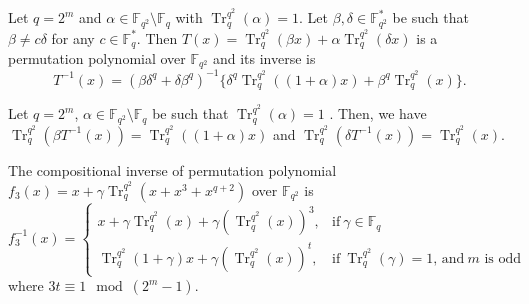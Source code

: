 \documentclass[10pt,a4paper]{amsart}
\begin{document}
	\begin{lem}\label{lem2}
		Let $q=2^m$ and $\alpha\in\mathbb{F}_{q^2}\setminus\mathbb{F}_q$ with $\operatorname{Tr}_q^{q^2}(\alpha)=1$.  Let $\beta, \delta \in \mathbb{F}^{*}_{q^2}$ be such that $\beta \neq c\delta$ for any $c \in \mathbb{F}^{*}_{q}$. 
		Then 
		$T(x)=\operatorname{Tr}_{q}^{q^2}(\beta x)+\alpha\operatorname{Tr}_{q}^{q^2}(\delta x)$ is a permutation polynomial over $\mathbb{F}_{q^2}$ and its inverse is
		$$T^{-1}(x)=(\beta\delta^{q}+\delta\beta^{q})^{-1}\{\delta^{q}\operatorname{Tr}_{q}^{q^2}((1+\alpha)x)+\beta^{q}\operatorname{Tr}_{q}^{q^2}(x)\}.$$
	\end{lem}

	\begin{lem} \label{lem3}
		Let $q=2^m$, $\alpha\in\mathbb{F}_{q^2}\setminus\mathbb{F}_q$ be such that $\operatorname{Tr}_q^{q^2}(\alpha)=1$ . Then, we have 
		$\operatorname{Tr}_{q}^{q^2}(\beta T^{-1}(x))=\operatorname{Tr}_{q}^{q^2}((1+\alpha)x)$ and 
		$\operatorname{Tr}_{q}^{q^2}(\delta T^{-1}(x))=\operatorname{Tr}_{q}^{q^2}(x).$
	\end{lem}

\begin{thm} The compositional inverse of permutation polynomial 
		$f_3(x)=x+\gamma\operatorname{Tr}_{q}^{q^2}(x+x^3+x^{q+2})$ over $\mathbb{F}_{q^2}$ is \\
	$f_3^{-1}(x)=\begin{cases}x+\gamma\operatorname{Tr}_{q}^{q^2}(x)+\gamma(\operatorname{Tr}_{q}^{q^2}(x))^3,& \text{if}~\gamma\in\mathbb{F}_q\\
	\operatorname{Tr}_{q}^{q^2}(1+\gamma)x+\gamma(\operatorname{Tr}_{q}^{q^2}(x))^t,& \text{if}~\operatorname{Tr}_{q}^{q^2}(\gamma)=1\text{, } \text{and}~ m \text{ is odd}
	\end{cases}$\\
	where $3t\equiv 1\mod{(2^m-1)}$.
\end{thm}
\end{document}
